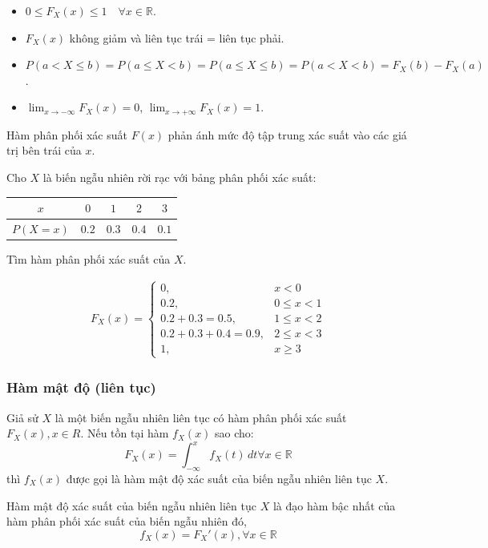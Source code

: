 \documentclass[12pt,a4paper]{article}
\begin{document}
\begin{tinhchat}[title={Tính chất của hàm phân phối}]
\begin{itemize}
  \item $0 \le F_X(x) \le 1 \quad \forall x \in \mathbb{R}$.
  \item $F_X(x)$ không giảm và liên tục trái = liên tục phải.
  \item $P(a < X \le b) = P(a \le X < b) = P(a \le X \le b) = P(a < X < b) = F_X(b) - F_X(a)$.
  \item $\lim_{x \to -\infty} F_X(x) = 0$, $\lim_{x \to +\infty} F_X(x) = 1$.
\end{itemize}
\end{tinhchat}

\begin{ynghia}[title={Ý nghĩa của hàm phân phối}]
  Hàm phân phối xác suất $F(x)$ phản ánh mức độ tập trung xác suất vào các giá trị bên trái của $x$.
\end{ynghia}

\begin{vidu}[title={Hàm phân phối của biến ngẫu nhiên}]
  Cho $X$ là biến ngẫu nhiên rời rạc với bảng phân phối xác suất:
  \begin{center}
    \begin{tabular}{c|cccc}
      $x$ & $0$ & $1$ & $2$ & $3$ \\
      \hline
      $P(X=x)$ & $0.2$ & $0.3$ & $0.4$ & $0.1$ \\
    \end{tabular}
  \end{center}
  Tìm hàm phân phối xác suất của $X$.

  \begin{align*}
    F_X(x) = \begin{cases}
      0, & x < 0 \\
      0.2, & 0 \le x < 1 \\
      0.2 + 0.3 = 0.5, & 1 \le x < 2 \\
      0.2 + 0.3 + 0.4 = 0.9, & 2 \le x < 3 \\
      1, & x \ge 3
    \end{cases}
  \end{align*}
\end{vidu}

\subsubsection{Hàm mật độ (liên tục)}

\begin{dinhnghia}
  Giả sử  $X$ là một biến ngẫu nhiên liên tục có hàm phân phối xác suất $F_X(x), x \in R$. Nếu tồn tại hàm $f_X(x)$ sao cho:
  \[
    F_X(x) = \displaystyle\int_{-\infty}^{x} f_X(t)\,dt \forall x \in \mathbb{R} 
  \]
  thì $f_X(x)$ được gọi là hàm mật độ xác suất của biến ngẫu nhiên liên tục $X$.

  Hàm mật độ xác suất của biến ngẫu nhiên liên tục $X$ là đạo hàm bậc nhất của hàm phân phối xác suất của biến ngẫu nhiên đó,
  \[
    f_X(x) = F_X'(x), \forall x \in \mathbb{R}
  \]
\end{dinhnghia}
\end{document}
